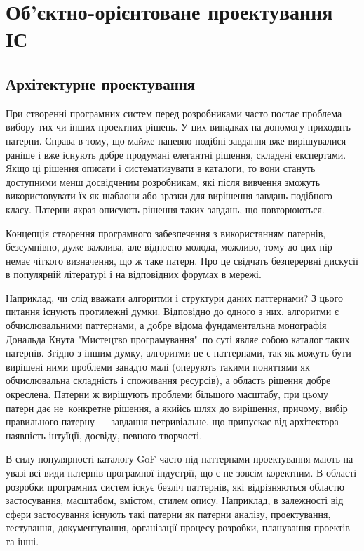 \documentclass[../main.tex]{subfiles}
\begin{document}
\chapter{Об’єктно-орієнтоване проектування ІС}

\section{Архітектурне проектування}

При створенні програмних систем перед розробниками часто постає проблема вибору тих чи інших проектних рішень. У цих випадках на допомогу приходять патерни. Справа в тому, що майже напевно подібні завдання вже вирішувалися раніше і вже існують добре продумані елегантні рішення, складені експертами. Якщо ці рішення описати і систематизувати в каталоги, то вони стануть доступними менш досвідченим розробникам, які після вивчення зможуть використовувати їх як шаблони або зразки для вирішення завдань подібного класу. Патерни якраз описують рішення таких завдань, що повторюються.~\cite{uml_patterns}

Концепція створення програмного забезпечення з використанням патернів, безсумнівно, дуже важлива, але відносно молода, можливо, тому до цих пір немає чіткого визначення, що ж таке патерн. Про це свідчать безперервні дискусії в популярній літературі і на відповідних форумах в мережі.

Наприклад, чи слід вважати алгоритми і структури даних паттернами? З цього питання існують протилежні думки. Відповідно до одного з них, алгоритми є обчислювальними паттернами, а добре відома фундаментальна монографія Дональда Кнута "Мистецтво програмування"\ по суті являє собою каталог таких патернів. Згідно з іншим думку, алгоритми не є паттернами, так як можуть бути вирішені ними проблеми занадто малі (оперують такими поняттями як обчислювальна складність і споживання ресурсів), а область рішення добре окреслена. Патерни ж вирішують проблеми більшого масштабу, при цьому патерн дає не~конкретне рішення, а якийсь шлях до вирішення, причому, вибір правильного патерну — завдання нетривіальне, що припускає від архітектора наявність інтуїції, досвіду, певного творчості.~\cite{design_patterns}


В силу популярності каталогу GoF \cite{gof} часто під паттернами проектування мають на увазі всі види патернів програмної індустрії, що є не зовсім коректним. В області розробки програмних систем існує безліч паттернів, які відрізняються областю застосування, масштабом, вмістом, стилем опису. Наприклад, в залежності від сфери застосування існують такі патерни як патерни аналізу, проектування, тестування, документування, організації процесу розробки, планування проектів та інші.~\cite{elemental_design_patterns}
\end{document}
